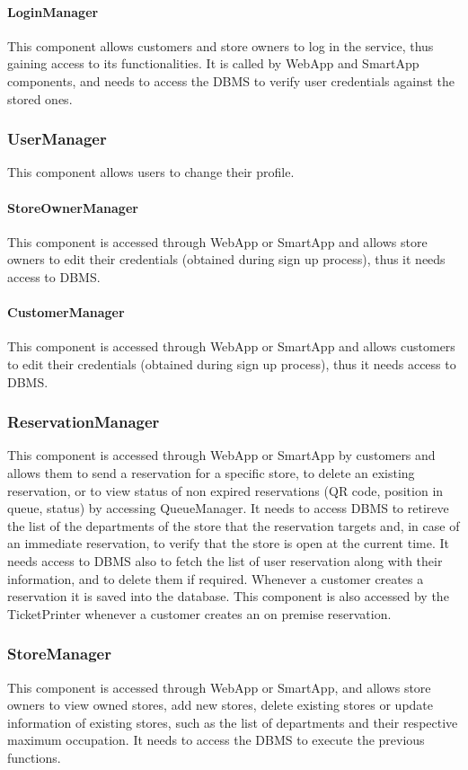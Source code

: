 \paragraph{LoginManager}
This component allows customers and store owners to log in the service, thus gaining access to its functionalities. It is called by WebApp and SmartApp components, and needs to access the DBMS to verify user credentials against the stored ones.
\subsubsection{UserManager}
This component allows users to change their profile.
\paragraph{StoreOwnerManager}
This component is accessed through WebApp or SmartApp and allows store owners to edit their credentials (obtained during sign up process), thus it needs access to DBMS.
\paragraph{CustomerManager}
This component is accessed through WebApp or SmartApp and allows customers to edit their credentials (obtained during sign up process), thus it needs access to DBMS.
\subsubsection{ReservationManager}
This component is accessed through WebApp or SmartApp by customers and allows them to send a reservation for a specific store, to delete an existing reservation, or to view status of non expired reservations (QR code, position in queue, status) by accessing QueueManager. It needs to access DBMS to retireve the list of the departments of the store that the reservation targets and, in case of an immediate reservation, to verify that the store is open at the current time. It needs access to DBMS also to fetch the list of user reservation along with their information, and to delete them if required. Whenever a customer creates a reservation it is saved into the database. This component is also accessed by the TicketPrinter whenever a customer creates an on premise reservation.
\subsubsection{StoreManager}
This component is accessed through WebApp or SmartApp, and allows store owners to view owned stores, add new stores, delete existing stores or update information of existing stores, such as the list of departments and their respective maximum occupation. It needs to access the DBMS to execute the previous functions.
